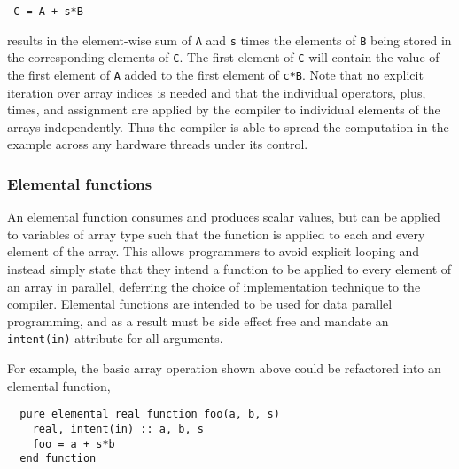 {\small
\begin{verbatim}
 C = A + s*B
\end{verbatim}
}

\noindent results in the element-wise sum of {\tt A} and {\tt s} times
the elements of {\tt B} being stored in the corresponding elements of
{\tt C}. The first element of {\tt C} will contain the value of the
first element of {\tt A} added to the first element of {\tt c*B}.
Note that no explicit iteration over array indices is needed and that
the individual operators, plus, times, and assignment are applied by
the compiler to individual elements of the arrays independently.  Thus
the compiler is able to spread the computation in the example across
any hardware threads under its control.


\subsubsection*{Elemental functions}

An elemental function consumes and produces scalar values, but can be applied
to variables of array type such that the function is applied to each and every
element of the array.  This allows programmers to avoid explicit looping and
instead simply state that they intend a function to be applied to every
element of an array in parallel, deferring the choice of implementation
technique to the compiler.  Elemental functions are intended to be used for
data parallel programming, and as a result must be side effect free and
mandate an {\tt intent(in)} attribute for all arguments.


For example, the basic array operation shown above could be refactored into
an elemental function,

{\small
\begin{verbatim}
  pure elemental real function foo(a, b, s)
    real, intent(in) :: a, b, s
    foo = a + s*b
  end function
\end{verbatim}
}

